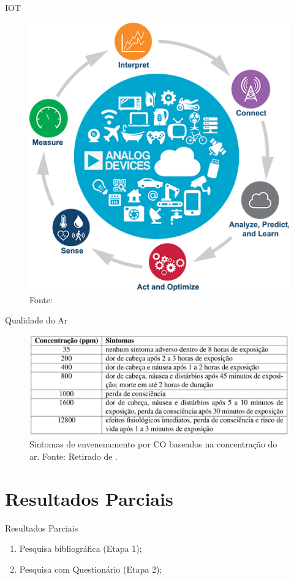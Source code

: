 \documentclass[12pt]{beamer}
\begin{document}
    \begin{frame}{IOT}
        \begin{figure}
            \centering
            \includegraphics[width=0.5\linewidth]{cicloIOT.png}
            \caption{Fonte: \cite{cicloIOT}}
            \label{fig:fig6}
        \end{figure}
    \end{frame}
    
    \begin{frame}{Qualidade do Ar}
        \begin{figure}
            \centering
            \includegraphics[width=0.95\linewidth]{tabela-co.png}
            \caption{Sintomas de envenenamento por CO baseados na concentração do ar. Fonte: Retirado de \cite{tabelaCO}.}
            \label{fig:f7}
        \end{figure}
    \end{frame}

    \section{Resultados Parciais}

    \begin{frame}{Resultados Parciais}
        \begin{enumerate}
            \item Pesquisa bibliográfica (Etapa 1);
            \item Pesquisa com Questionário (Etapa 2);
        \end{enumerate}
    \end{frame}
\end{document}
